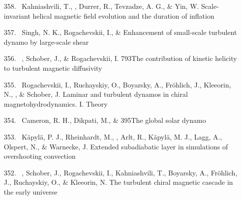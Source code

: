 \begin{itemize}
\item[{358.}~]
Kahniashvili, T., \Brandenburg, Durrer, R., Tevzadze, A. G., \& Yin, W.
{Scale-invariant helical magnetic field evolution and the duration of inflation}

\item[{357.}~]
Singh, N. K., Rogachevskii, I., \& \Brandenburg{}
{Enhancement of small-scale turbulent dynamo by large-scale shear}

\item[{356.}~]
\Brandenburg, Schober, J., \& Rogachevskii, I.
{793}{The contribution of kinetic helicity to turbulent magnetic diffusivity}

\item[{355.}~]
Rogachevskii, I., Ruchayskiy, O., Boyarsky, A., Fr\"{o}hlich, J., Kleeorin, N., \Brandenburg, \& Schober, J.
{Laminar and turbulent dynamos in chiral magnetohydrodynamics. I. Theory}

\item[{354.}~]
Cameron, R. H., Dikpati, M., \& \Brandenburg{}
{395}{The global solar dynamo}

\item[{353.}~]
K\"apyl\"a, P. J., Rheinhardt, M., \Brandenburg, Arlt, R., K\"apyl\"a, M. J., Lagg, A., Olspert, N., \& Warnecke, J.
{Extended subadiabatic layer in simulations of overshooting convection}

\item[{352.}~]
\Brandenburg, Schober, J., Rogachevskii, I., Kahniashvili, T., Boyarsky, A., Fr\"ohlich, J., Ruchayskiy, O., \& Kleeorin, N.
{The turbulent chiral magnetic cascade in the early universe}


\end{itemize}
